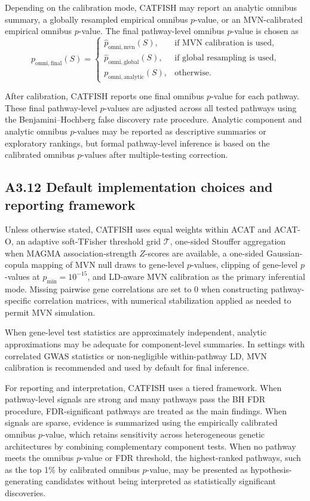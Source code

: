 \documentclass[unnumsec,webpdf,contemporary,large]{oup-authoring-template}%
\theoremstyle{thmstyleone}%
\theoremstyle{thmstyletwo}%
\theoremstyle{thmstylethree}%
\begin{document}
\begin{appendices}
Depending on the calibration mode, CATFISH may report an analytic omnibus summary, a globally resampled empirical omnibus $p$-value, or an MVN-calibrated empirical omnibus $p$-value. The final pathway-level omnibus $p$-value is chosen as
\[
p_{\mathrm{omni,final}}(S)
=
\begin{cases}
\hat p_{\mathrm{omni,mvn}}(S), & \text{if MVN calibration is used},\\[4pt]
\hat p_{\mathrm{omni,global}}(S), & \text{if global resampling is used},\\[4pt]
p_{\mathrm{omni,analytic}}(S), & \text{otherwise}.
\end{cases}
\]

After calibration, CATFISH reports one final omnibus $p$-value for each pathway. These final pathway-level $p$-values are adjusted across all tested pathways using the Benjamini--Hochberg false discovery rate procedure. Analytic component and analytic omnibus $p$-values may be reported as descriptive summaries or exploratory rankings, but formal pathway-level inference is based on the calibrated omnibus $p$-values after multiple-testing correction.

\subsection{A3.12 Default implementation choices and reporting framework}

Unless otherwise stated, CATFISH uses equal weights within ACAT and ACAT-O, an adaptive soft-TFisher threshold grid $\mathcal{T}$, one-sided Stouffer aggregation when MAGMA association-strength $Z$-scores are available, a one-sided Gaussian-copula mapping of MVN null draws to gene-level $p$-values, clipping of gene-level $p$-values at $p_{\min}=10^{-15}$, and LD-aware MVN calibration as the primary inferential mode. Missing pairwise gene correlations are set to 0 when constructing pathway-specific correlation matrices, with numerical stabilization applied as needed to permit MVN simulation.

When gene-level test statistics are approximately independent, analytic approximations may be adequate for component-level summaries. In settings with correlated GWAS statistics or non-negligible within-pathway LD, MVN calibration is recommended and used by default for final inference.

For reporting and interpretation, CATFISH uses a tiered framework. When pathway-level signals are strong and many pathways pass the BH FDR procedure, FDR-significant pathways are treated as the main findings. When signals are sparse, evidence is summarized using the empirically calibrated omnibus $p$-value, which retains sensitivity across heterogeneous genetic architectures by combining complementary component tests. When no pathway meets the omnibus $p$-value or FDR threshold, the highest-ranked pathways, such as the top 1\% by calibrated omnibus $p$-value, may be presented as hypothesis-generating candidates without being interpreted as statistically significant discoveries.



\end{appendices}
\end{document}
